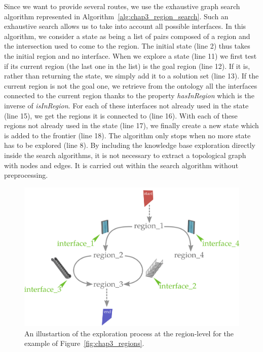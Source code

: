 Since we want to provide several routes, we use the exhaustive graph search algorithm represented in Algorithm~\ref{alg:chap3_region_search}. Such an exhaustive search allows us to take into account all possible interfaces. In this algorithm, we consider a state as being a list of pairs composed of a region and the intersection used to come to the region. The initial state (line 2) thus takes the initial region and no interface. When we explore a state (line 11) we first test if its current region (the last one in the list) is the goal region (line 12). If it is, rather than returning the state, we simply add it to a solution set (line 13). If the current region is not the goal one, we retrieve from the ontology all the interfaces connected to the current region thanks to the property \textit{hasInRegion} which is the inverse of \textit{isInRegion}. For each of these interfaces not already used in the state (line 15), we get the regions it is connected to (line 16). With each of these regions not already used in the state (line 17), we finally create a new state which is added to the frontier (line 18). The algorithm only stops when no more state has to be explored (line 8). By including the knowledge base exploration directly inside the search algorithms, it is not necessary to extract a topological graph with nodes and edges. It is carried out within the search algorithm without preprocessing.

\begin{figure}[ht!]
\centering
\includegraphics[scale=0.12]{figures/chapter3/Region_exploration_graph.png}
\caption{\label{fig:chap3_region_expl} An illustartion of the exploration process at the region-level for the example of Figure~\ref{fig:chap3_regions}.}
\end{figure}

